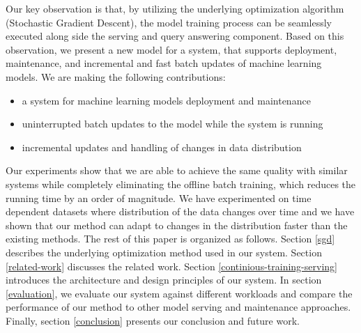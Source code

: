 \documentclass{sig-alternate-05-2015}
\begin{document}
Our key observation is that, by utilizing the underlying optimization algorithm (Stochastic Gradient Descent), the model training process can be seamlessly executed along side the serving and query answering component.
Based on this observation, we present a new model for a system, that supports deployment, maintenance, and incremental and fast batch updates of machine learning models.
We are making the following contributions: 
\begin{itemize}
\item a system for machine learning models deployment and maintenance
\item uninterrupted batch updates to the model while the system is running
\item incremental updates and handling of changes in data distribution
\end{itemize}
Our experiments show that we are able to achieve the same quality with similar systems while completely eliminating the offline batch training, which reduces the running time by an order of magnitude. 
We have experimented on time dependent datasets where distribution of the data changes over time and we have shown that our method can adapt to changes in the distribution faster than the existing methods.
The rest of this paper is organized as follows. 
Section \ref{sgd} describes the underlying optimization method used in our system. 
Section \ref {related-work} discusses the related work.
Section \ref{continious-training-serving} introduces the architecture and design principles of our system. 
In section \ref{evaluation}, we evaluate our system against different workloads and compare the performance of our method to other model serving and maintenance approaches. 
Finally, section \ref{conclusion} presents our conclusion and future work.
\end{document}
